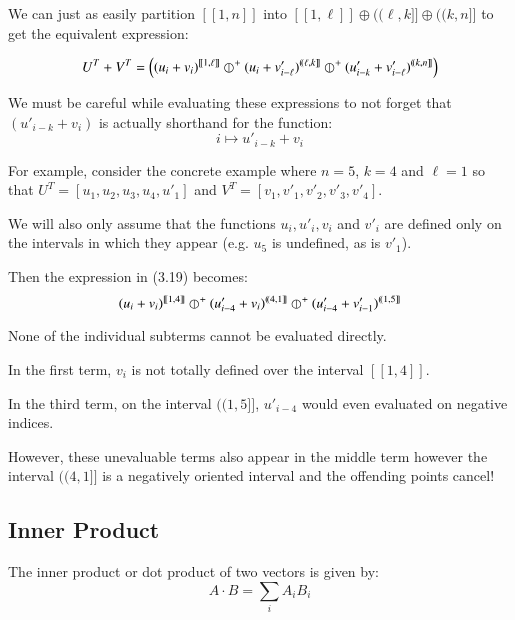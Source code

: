 We can just as easily partition $[\![1,n]\!]$ into $[\![1,\ell]\!] \oplus (\!(\ell, k]\!] \oplus (\!(k, n]\!]$ to get the equivalent expression:

\begin{equation}
	U^T + V^T = \left( (u_i + v_i)^{[\![1, \ell]\!]} 
		\hjoin[+] (u_{i} + v'_{i-\ell})^{(\!(\ell,k]\!]} 
		\hjoin[+] (u'_{i-k}+v'_{i-\ell})^{(\!(k,n]\!]} \right)
\end{equation}

We must be careful while evaluating these expressions to not forget that $(u'_{i-k} + v_i)$ is actually shorthand for the function:
\begin{equation*}
	i \mapsto u'_{i-k} + v_i
\end{equation*}

For example, consider the concrete example where $n=5$, $k=4$ and $\ell = 1$ so that
$U^T = [ u_1, u_2, u_3, u_4, u'_1 ]$ and
$V^T = [ v_1, v'_1, v'_2, v'_3, v'_4 ]$.

We will also only assume that the functions $u_i, u'_i, v_i$ and $v'_i$ are defined only on the intervals in which they appear (e.g. $u_5$ is undefined, as is $v'_1$).

Then the expression in (3.19) becomes:
\begin{equation}
(u_i + v_i)^{[\![1,4]\!]} \hjoin[+] (u'_{i-4} + v_i)^{(\!(4,1]\!]} \hjoin[+] (u'_{i-4} + v'_{i-1})^{(\!(1,5]\!]}
\end{equation}

None of the individual subterms cannot be evaluated directly.

In the first term, $v_i$ is not totally defined over the interval $[\![1,4]\!]$.

In the third term, on the interval $(\!(1,5]\!]$, $u'_{i-4}$ would even evaluated on negative indices.

However, these unevaluable terms also appear in the middle term however the interval $(\!(4,1]\!]$ is a negatively oriented interval and the offending points cancel!




\subsection{Inner Product}

The inner product or dot product of two vectors is given by:
\begin{equation}
A \cdot B = \sum_i A_i B_i
\end{equation}

